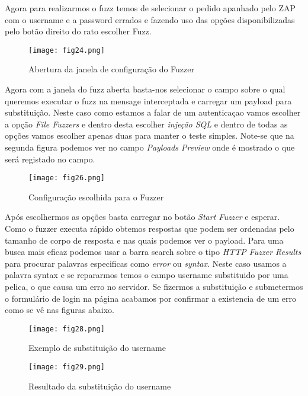 Agora para realizarmos o fuzz temos de selecionar o pedido apanhado pelo ZAP com o username e a password errados e fazendo uso das opções disponibilizadas pelo botão direito do rato escolher Fuzz.

\begin{figure}[H]

  \centering

  \texttt{[image: fig24.png]}

  \caption{Abertura da janela de configuração do Fuzzer}

\end{figure}

Agora com a janela do fuzz aberta basta-nos selecionar o campo sobre o qual queremos executar o fuzz na mensage interceptada e carregar um payload para substituição. Neste caso como estamos a falar de um autenticaçao vamos escolher a opção \textit{File Fuzzers} e dentro desta escolher \textit{injeção SQL} e dentro de todas as opções vamos escolher apenas duas para manter o teste simples. Note-se que na segunda figura podemos ver no campo \textit{Payloads Preview} onde é mostrado o que será registado no campo.

\begin{figure}[H]

  \centering

  \texttt{[image: fig26.png]}

  \caption{Configuração escolhida para o Fuzzer}

\end{figure}

Após escolhermos as opções basta carregar no botão \textit{Start Fuzzer} e esperar. Como o fuzzer executa rápido obtemos respostas que podem ser ordenadas pelo tamanho de corpo de resposta e nas quais podemos ver o payload. Para uma busca mais eficaz podemos usar a barra search sobre o tipo \textit{HTTP Fuzzer Results} para procurar palavras especificas como \textit{error} ou \textit{syntax}. Neste caso usamos a palavra syntax e se repararmos temos o campo username substituido por uma pelica, o que causa um erro no servidor. Se fizermos a substituição e submetermos o formulário de login na página acabamos por confirmar a existencia de um erro como se vê nas figuras abaixo.

\begin{figure}[H]

  \centering

  \texttt{[image: fig28.png]}

  \caption{Exemplo de substituição do username}

\end{figure}
\begin{figure}[H]

  \centering

  \texttt{[image: fig29.png]}

  \caption{Resultado da substituição do username}

\end{figure}

